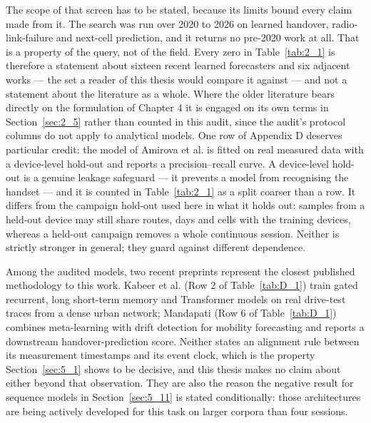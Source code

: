 The scope of that screen has to be stated, because its limits bound every claim made from it. The search was run over 2020 to 2026 on learned handover, radio-link-failure and next-cell prediction, and it returns no pre-2020 work at all. That is a property of the query, not of the field. Every zero in Table~\ref{tab:2_1} is therefore a statement about sixteen recent learned forecasters and six adjacent works --- the set a reader of this thesis would compare it against --- and not a statement about the literature as a whole. Where the older literature bears directly on the formulation of Chapter 4 it is engaged on its own terms in Section~\ref{sec:2_5} rather than counted in this audit, since the audit's protocol columns do not apply to analytical models. One row of Appendix D deserves particular credit: the model of Amirova et al. \cite{ref15} is fitted on real measured data with a device-level hold-out and reports a precision--recall curve. A device-level hold-out is a genuine leakage safeguard --- it prevents a model from recognising the handset --- and it is counted in Table~\ref{tab:2_1} as a split coarser than a row. It differs from the campaign hold-out used here in what it holds out: samples from a held-out device may still share routes, days and cells with the training devices, whereas a held-out campaign removes a whole continuous session. Neither is strictly stronger in general; they guard against different dependence.

Among the audited models, two recent preprints represent the closest published methodology to this work. Kabeer et al. \cite{ref45} (Row 2 of Table~\ref{tab:D_1}) train gated recurrent, long short-term memory and Transformer models on real drive-test traces from a dense urban network; Mandapati \cite{ref46} (Row 6 of Table~\ref{tab:D_1}) combines meta-learning with drift detection for mobility forecasting and reports a downstream handover-prediction score. Neither states an alignment rule between its measurement timestamps and its event clock, which is the property Section~\ref{sec:5_1} shows to be decisive, and this thesis makes no claim about either beyond that observation. They are also the reason the negative result for sequence models in Section~\ref{sec:5_11} is stated conditionally: those architectures are being actively developed for this task on larger corpora than four sessions.

